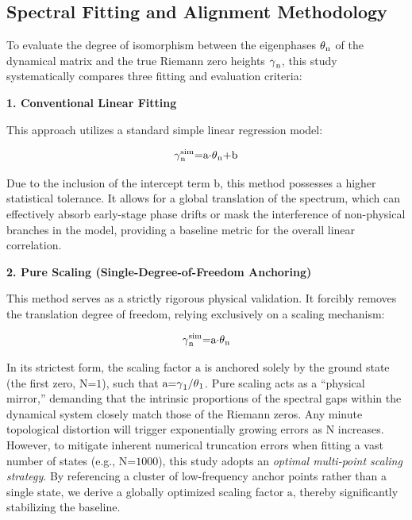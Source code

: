 \documentclass[fleqn,10pt]{wlscirep}
\begin{document}
\subsection*{Spectral Fitting and Alignment Methodology}

To evaluate the degree of isomorphism between the eigenphases
\(\text{\ensuremath{\theta}}_{\text{n}}\) of the dynamical matrix and the true Riemann
zero heights \(\text{\ensuremath{\gamma}}_{\text{n}}\), this study systematically compares
three fitting and evaluation criteria:

\textbf{1. Conventional Linear Fitting}

This approach utilizes a standard simple linear regression model:

\[\text{\ensuremath{\gamma}}_{\text{n}}^{\text{sim}}\text{=}\text{a}\text{\ensuremath{\cdot}}\text{\ensuremath{\theta}}_{\text{n}}\text{+}\text{b}\]

Due to the inclusion of the intercept term \(\text{b}\), this method
possesses a higher statistical tolerance. It allows for a global
translation of the spectrum, which can effectively absorb early-stage
phase drifts or mask the interference of non-physical branches in the
model, providing a baseline metric for the overall linear correlation.

\textbf{2. Pure Scaling (Single-Degree-of-Freedom Anchoring)}

This method serves as a strictly rigorous physical validation. It
forcibly removes the translation degree of freedom, relying exclusively
on a scaling mechanism:

\[\text{\ensuremath{\gamma}}_{\text{n}}^{\text{sim}}\text{=}\text{a}\text{\ensuremath{\cdot}}\text{\ensuremath{\theta}}_{\text{n}}\]

In its strictest form, the scaling factor \(\text{a}\) is anchored
solely by the ground state (the first zero, \(\text{N}\text{=1}\)), such
that \(\text{a}\text{=}\text{\ensuremath{\gamma}}_{\text{1}}\text{/}\text{\ensuremath{\theta}}_{\text{1}}\).
Pure scaling acts as a ``physical mirror,'' demanding that the intrinsic
proportions of the spectral gaps within the dynamical system closely
match those of the Riemann zeros. Any minute topological distortion will
trigger exponentially growing errors as \(\text{N}\) increases. However,
to mitigate inherent numerical truncation errors when fitting a vast
number of states (e.g., \(\text{N}\text{=1000}\)), this study adopts an
\emph{optimal multi-point scaling strategy}. By referencing a cluster of
low-frequency anchor points rather than a single state, we derive a
globally optimized scaling factor \(\text{a}\), thereby significantly
stabilizing the baseline.
\end{document}
